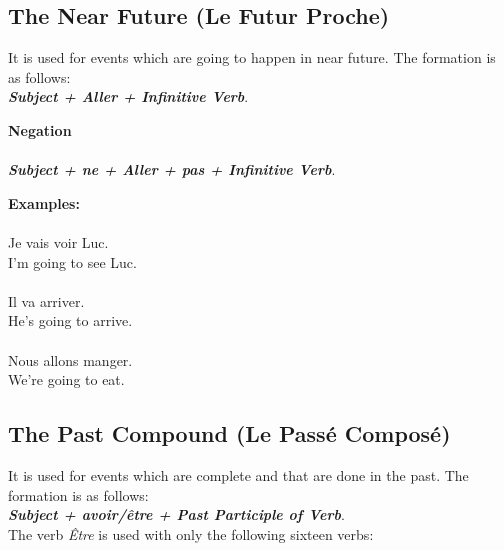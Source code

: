 \subsection{The Near Future (Le Futur Proche)}

It is used for events which are going to happen in near future.
The formation is as follows:\\

\textbf{\emph{Subject + Aller + Infinitive Verb}}.

\vspace{0.2in}

\noindent \textbf{Negation}\\\\
\textbf{\emph{Subject + ne + Aller + pas + Infinitive Verb}}.

\noindent \textbf{Examples:}\\\\
Je vais voir Luc.\\
I'm going to see Luc.\\\\
Il va arriver.\\
He's going to arrive.\\\\
Nous allons manger.\\
We're going to eat.

\subsection{The Past Compound (Le Pass\'e Compos\'e)}
\label{sec:pastTense}
It is used for events which are complete and that are done in the past.
The formation is as follows:\\

\textbf{\emph{Subject + avoir/\^etre + Past Participle of Verb}}.\\

\noindent The verb \emph{\^Etre} is used with only the following sixteen verbs:\\\\

